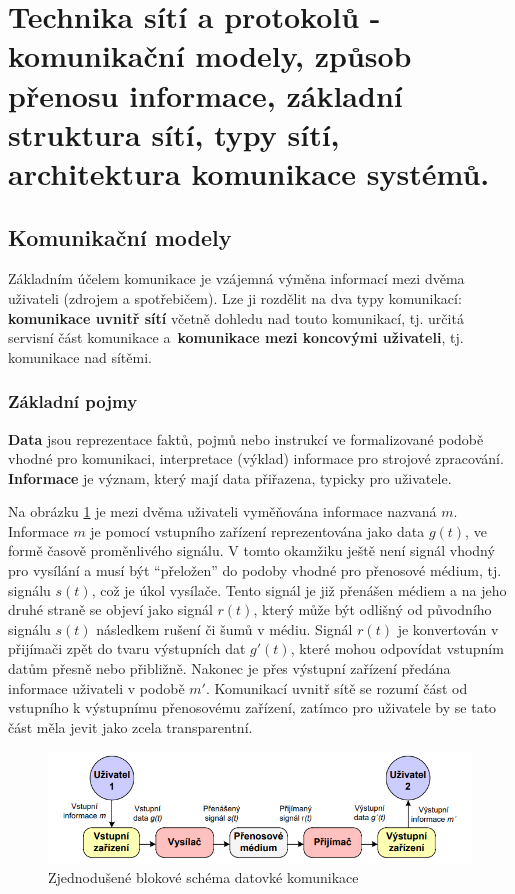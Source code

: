 \section{Technika sítí a protokolů - komunikační modely, způsob přenosu informace, základní struktura sítí, typy sítí, architektura komunikace systémů.}

\subsection{Komunikační modely}

Základním účelem komunikace je vzájemná výměna informací mezi dvěma uživateli (zdrojem a
spotřebičem). Lze ji rozdělit na dva typy komunikací: \textbf{komunikace uvnitř sítí} včetně dohledu nad touto komunikací, tj. určitá servisní část komunikace a~\textbf{komunikace mezi koncovými uživateli}, tj. komunikace nad sítěmi.

\subsubsection{Základní pojmy}

\textbf{Data} jsou reprezentace faktů, pojmů nebo instrukcí ve formalizované podobě vhodné pro
komunikaci, interpretace (výklad) informace pro strojové zpracování. \textbf{Informace} je význam, který mají data přiřazena, typicky pro uživatele.

Na obrázku \ref{q01_simplified_scheme_network} je mezi dvěma uživateli vyměňována informace nazvaná $m$. Informace $m$ je pomocí vstupního zařízení reprezentována jako data $g(t)$, ve formě časově proměnlivého signálu. V tomto okamžiku ještě není signál vhodný pro vysílání a musí být \enquote{přeložen} do podoby vhodné pro přenosové médium, tj. signálu $s(t)$, což je úkol vysílače. Tento signál je již přenášen médiem a na jeho druhé straně se objeví jako signál $r(t)$, který může být odlišný od původního signálu $s(t)$ následkem rušení či šumů v médiu. Signál $r(t)$ je konvertován v přijímači zpět do tvaru výstupních dat $g'(t)$, které mohou odpovídat vstupním datům přesně nebo přibližně. Nakonec je přes výstupní zařízení předána informace uživateli v podobě $m'$. Komunikací uvnitř sítě se rozumí část od vstupního k výstupnímu přenosovému zařízení, zatímco pro uživatele by se tato část měla jevit jako zcela transparentní.

\begin{figure}[ht]
	\centering
	\includegraphics[width=\textwidth]{images/q01_simplified_scheme_network}
	\caption{Zjednodušené blokové schéma datovké komunikace}
	\label{q01_simplified_scheme_network}
\end{figure}

